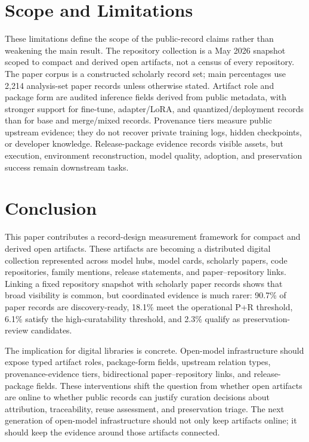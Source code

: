 \section{Scope and Limitations}
\label{sec:limitations}

These limitations define the scope of the public-record claims rather than weakening the main result. The repository collection is a May 2026 \hf snapshot scoped to compact and derived open \llm artifacts, not a census of every \hf repository. The paper corpus is a constructed scholarly record set; main percentages use 2,214 analysis-set paper records unless otherwise stated. Artifact role and package form are audited inference fields derived from public metadata, with stronger support for fine-tune, adapter/LoRA, and quantized/deployment records than for base and merge/mixed records. Provenance tiers measure public upstream evidence; they do not recover private training logs, hidden checkpoints, or developer knowledge. Release-package evidence records visible assets, but execution, environment reconstruction, model quality, adoption, and preservation success remain downstream tasks.

\section{Conclusion}
\label{sec:conclusion}

This paper contributes a record-design measurement framework for compact and derived open \llm artifacts. These artifacts are becoming a distributed digital collection represented across model hubs, model cards, scholarly papers, code repositories, family mentions, release statements, and paper--repository links. Linking a fixed \hf repository snapshot with scholarly paper records shows that broad visibility is common, but coordinated evidence is much rarer: 90.7\% of paper records are discovery-ready, 18.1\% meet the operational P+R threshold, 6.1\% satisfy the high-curatability threshold, and 2.3\% qualify as preservation-review candidates.

The implication for digital libraries is concrete. Open-model infrastructure should expose typed artifact roles, package-form fields, upstream relation types, provenance-evidence tiers, bidirectional paper--repository links, and release-package fields. These interventions shift the question from whether open \llm artifacts are online to whether public records can justify curation decisions about attribution, traceability, reuse assessment, and preservation triage. The next generation of open-model infrastructure should not only keep artifacts online; it should keep the evidence around those artifacts connected.
